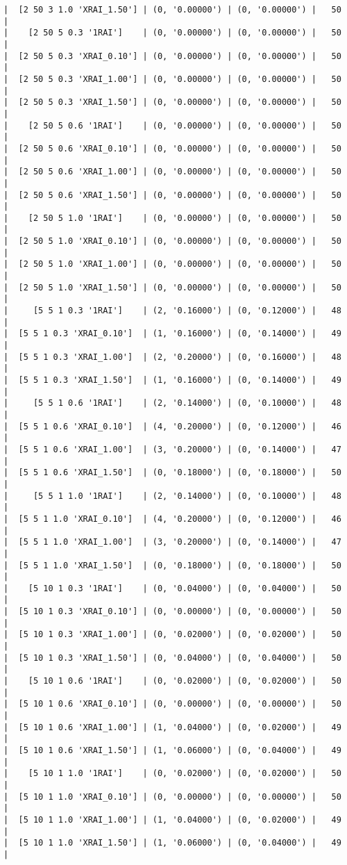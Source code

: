 \documentclass{article}
\begin{document}
\begin{verbatim}
|  [2 50 3 1.0 'XRAI_1.50'] | (0, '0.00000') | (0, '0.00000') |   50  |
|    [2 50 5 0.3 '1RAI']    | (0, '0.00000') | (0, '0.00000') |   50  |
|  [2 50 5 0.3 'XRAI_0.10'] | (0, '0.00000') | (0, '0.00000') |   50  |
|  [2 50 5 0.3 'XRAI_1.00'] | (0, '0.00000') | (0, '0.00000') |   50  |
|  [2 50 5 0.3 'XRAI_1.50'] | (0, '0.00000') | (0, '0.00000') |   50  |
|    [2 50 5 0.6 '1RAI']    | (0, '0.00000') | (0, '0.00000') |   50  |
|  [2 50 5 0.6 'XRAI_0.10'] | (0, '0.00000') | (0, '0.00000') |   50  |
|  [2 50 5 0.6 'XRAI_1.00'] | (0, '0.00000') | (0, '0.00000') |   50  |
|  [2 50 5 0.6 'XRAI_1.50'] | (0, '0.00000') | (0, '0.00000') |   50  |
|    [2 50 5 1.0 '1RAI']    | (0, '0.00000') | (0, '0.00000') |   50  |
|  [2 50 5 1.0 'XRAI_0.10'] | (0, '0.00000') | (0, '0.00000') |   50  |
|  [2 50 5 1.0 'XRAI_1.00'] | (0, '0.00000') | (0, '0.00000') |   50  |
|  [2 50 5 1.0 'XRAI_1.50'] | (0, '0.00000') | (0, '0.00000') |   50  |
|     [5 5 1 0.3 '1RAI']    | (2, '0.16000') | (0, '0.12000') |   48  |
|  [5 5 1 0.3 'XRAI_0.10']  | (1, '0.16000') | (0, '0.14000') |   49  |
|  [5 5 1 0.3 'XRAI_1.00']  | (2, '0.20000') | (0, '0.16000') |   48  |
|  [5 5 1 0.3 'XRAI_1.50']  | (1, '0.16000') | (0, '0.14000') |   49  |
|     [5 5 1 0.6 '1RAI']    | (2, '0.14000') | (0, '0.10000') |   48  |
|  [5 5 1 0.6 'XRAI_0.10']  | (4, '0.20000') | (0, '0.12000') |   46  |
|  [5 5 1 0.6 'XRAI_1.00']  | (3, '0.20000') | (0, '0.14000') |   47  |
|  [5 5 1 0.6 'XRAI_1.50']  | (0, '0.18000') | (0, '0.18000') |   50  |
|     [5 5 1 1.0 '1RAI']    | (2, '0.14000') | (0, '0.10000') |   48  |
|  [5 5 1 1.0 'XRAI_0.10']  | (4, '0.20000') | (0, '0.12000') |   46  |
|  [5 5 1 1.0 'XRAI_1.00']  | (3, '0.20000') | (0, '0.14000') |   47  |
|  [5 5 1 1.0 'XRAI_1.50']  | (0, '0.18000') | (0, '0.18000') |   50  |
|    [5 10 1 0.3 '1RAI']    | (0, '0.04000') | (0, '0.04000') |   50  |
|  [5 10 1 0.3 'XRAI_0.10'] | (0, '0.00000') | (0, '0.00000') |   50  |
|  [5 10 1 0.3 'XRAI_1.00'] | (0, '0.02000') | (0, '0.02000') |   50  |
|  [5 10 1 0.3 'XRAI_1.50'] | (0, '0.04000') | (0, '0.04000') |   50  |
|    [5 10 1 0.6 '1RAI']    | (0, '0.02000') | (0, '0.02000') |   50  |
|  [5 10 1 0.6 'XRAI_0.10'] | (0, '0.00000') | (0, '0.00000') |   50  |
|  [5 10 1 0.6 'XRAI_1.00'] | (1, '0.04000') | (0, '0.02000') |   49  |
|  [5 10 1 0.6 'XRAI_1.50'] | (1, '0.06000') | (0, '0.04000') |   49  |
|    [5 10 1 1.0 '1RAI']    | (0, '0.02000') | (0, '0.02000') |   50  |
|  [5 10 1 1.0 'XRAI_0.10'] | (0, '0.00000') | (0, '0.00000') |   50  |
|  [5 10 1 1.0 'XRAI_1.00'] | (1, '0.04000') | (0, '0.02000') |   49  |
|  [5 10 1 1.0 'XRAI_1.50'] | (1, '0.06000') | (0, '0.04000') |   49  |

\end{verbatim}
\end{document}
